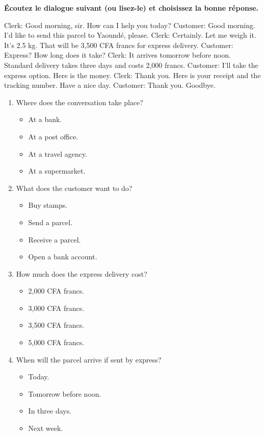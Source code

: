 \documentclass[11pt]{article}
\begin{document}
\begin{exercice}
\textbf{Écoutez le dialogue suivant (ou lisez-le) et choisissez la bonne réponse.}
\begin{textebox}
Clerk: Good morning, sir. How can I help you today?
Customer: Good morning. I'd like to send this parcel to Yaoundé, please.
Clerk: Certainly. Let me weigh it. It's 2.5 kg. That will be 3,500 CFA francs for express delivery.
Customer: Express? How long does it take?
Clerk: It arrives tomorrow before noon. Standard delivery takes three days and costs 2,000 francs.
Customer: I'll take the express option. Here is the money.
Clerk: Thank you. Here is your receipt and the tracking number. Have a nice day.
Customer: Thank you. Goodbye.
\end{textebox}
\begin{enumerate}
\item Where does the conversation take place? 
\begin{itemize}
\item[A.] At a bank. \item[B.] At a post office. \item[C.] At a travel agency. \item[D.] At a supermarket.
\end{itemize}
\item What does the customer want to do? 
\begin{itemize}
\item[A.] Buy stamps. \item[B.] Send a parcel. \item[C.] Receive a parcel. \item[D.] Open a bank account.
\end{itemize}
\item How much does the express delivery cost? 
\begin{itemize}
\item[A.] 2,000 CFA francs. \item[B.] 3,000 CFA francs. \item[C.] 3,500 CFA francs. \item[D.] 5,000 CFA francs.
\end{itemize}
\item When will the parcel arrive if sent by express? 
\begin{itemize}
\item[A.] Today. \item[B.] Tomorrow before noon. \item[C.] In three days. \item[D.] Next week.

\end{itemize}
\end{enumerate}
\end{exercice}
\end{document}

